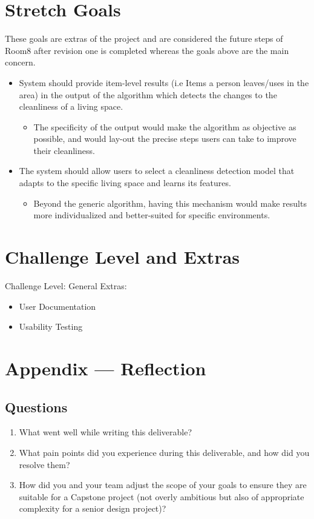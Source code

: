 \documentclass[12pt, titlepage]{article}
\begin{document}
\section{Stretch Goals}
These goals are extras of the project and are considered the future steps of Room8 after revision one is completed whereas the goals above are the main concern.
\begin{itemize}
\item System should provide item-level results (i.e Items a person leaves/uses in the area) in the output of the algorithm which detects the changes to the cleanliness of a living space.
\begin{itemize}
\item The specificity of the output would make the algorithm as objective as possible, and would lay-out the precise steps users can take to improve their cleanliness.
\end{itemize}
\item The system should allow users to select a cleanliness detection model that adapts to the specific living space and learns its features.
\begin{itemize}
\item Beyond the generic algorithm, having this mechanism would make results more individualized and better-suited for specific environments.
\end{itemize}
\end{itemize}


\section{Challenge Level and Extras}

Challenge Level: General
Extras:
\begin{itemize}
\item User Documentation
\item Usability Testing
\end{itemize}

\newpage{}

\section*{Appendix --- Reflection}
\subsection*{Questions}
\begin{enumerate}
    \item What went well while writing this deliverable? 
    \item What pain points did you experience during this deliverable, and how
    did you resolve them?
    \item How did you and your team adjust the scope of your goals to ensure
    they are suitable for a Capstone project (not overly ambitious but also of
    appropriate complexity for a senior design project)?
\end{enumerate}  
\end{document}
